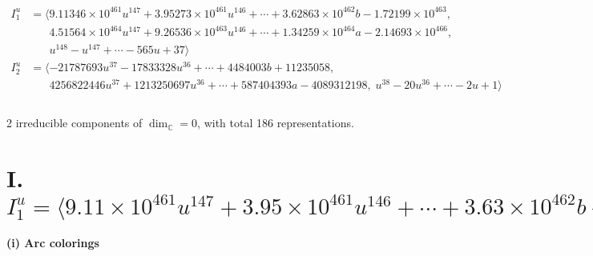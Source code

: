 \documentclass[1p]{elsarticle_modified}
\theoremstyle{definition}
\begin{document}
\begin{align*}
I^u_{1}&=\langle 
9.11346\times10^{461} u^{147}+3.95273\times10^{461} u^{146}+\cdots+3.62863\times10^{462} b-1.72199\times10^{463},\\
\phantom{I^u_{1}}&\phantom{= \langle  }4.51564\times10^{464} u^{147}+9.26536\times10^{463} u^{146}+\cdots+1.34259\times10^{464} a-2.14693\times10^{466},\\
\phantom{I^u_{1}}&\phantom{= \langle  }u^{148}- u^{147}+\cdots-565 u+37\rangle \\
I^u_{2}&=\langle 
-21787693 u^{37}-17833328 u^{36}+\cdots+4484003 b+11235058,\\
\phantom{I^u_{2}}&\phantom{= \langle  }4256822446 u^{37}+1213250697 u^{36}+\cdots+587404393 a-4089312198,\;u^{38}-20 u^{36}+\cdots-2 u+1\rangle \\
\\
\end{align*}
\raggedright * 2 irreducible components of $\dim_{\mathbb{C}}=0$, with total 186 representations.\\
\newpage
\renewcommand{\arraystretch}{1}
\centering \section*{I. $I^u_{1}= \langle 9.11\times10^{461} u^{147}+3.95\times10^{461} u^{146}+\cdots+3.63\times10^{462} b-1.72\times10^{463},\;4.52\times10^{464} u^{147}+9.27\times10^{463} u^{146}+\cdots+1.34\times10^{464} a-2.15\times10^{466},\;u^{148}- u^{147}+\cdots-565 u+37 \rangle$}
\flushleft \textbf{(i) Arc colorings}\\
\end{document}
